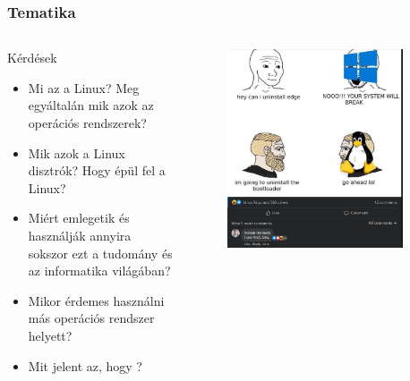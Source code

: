 \begin{frame}
\frametitle{Tematika}

\begin{columns}
	\begin{block}{Kérdések}
		\begin{itemize}
			\item Mi az a Linux? Meg egyáltalán mik azok az operációs rendszerek?
			\item Mik azok a Linux disztrók? Hogy épül fel a Linux?
			\item Miért emlegetik és használják annyira sokszor ezt a tudomány és az informatika világában?
			\item Mikor érdemes használni más operációs rendszer helyett?
			\item<2> Mit jelent az, hogy ?
		\end{itemize}
	\end{block}

	\pause

	\begin{figure}
		\includegraphics[width=0.9\textwidth]{images/archbtw.png}
	\end{figure}
\end{columns}
\end{frame}